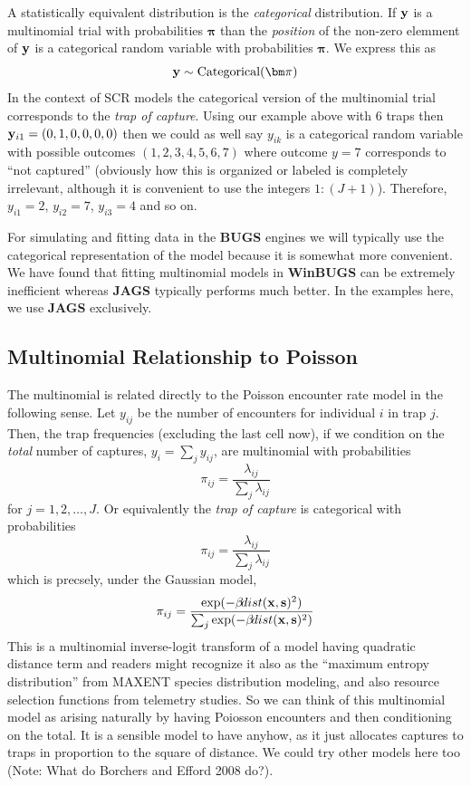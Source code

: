 A statistically equivalent distribution is the {\it categorical} distribution.
If ${\bf y}$ is a multinomial trial with probabilities
${\bm \pi}$ than the {\it position} of the non-zero
elemment of ${\bf y}$ is a categorical random variable with probabilities
${\bm \pi}$.
We express this as
\[
{\bf y} \sim \mbox{Categorical}( {\bm \pi} )
\]
In the context of SCR models the categorical version of the
multinomial trial corresponds to the {\it trap of capture}.  Using our
example above with 6 traps then ${\bf y}_{i1} = (0,1,0,0,0,0)$ then we
could as well say $y_{ik}$ is a categorical random variable with
possible outcomes $(1,2,3,4,5,6,7)$ where outcome $y=7$ corresponds to
``not captured'' (obviously how this is organized or labeled is
completely irrelevant, although it is convenient to use the integers
$1:(J+1)$).  Therefore, $y_{i1} = 2$, $y_{i2} = 7$, $y_{i3} = 4$ and
so on.

For simulating and fitting data in the {\bf BUGS} engines we will typically use
the categorical representation of the model because it is somewhat
more convenient.  We have found that fitting multinomial models in
{\bf WinBUGS} can be extremely inefficient whereas {\bf JAGS}
typically performs much better. In the examples here, we use {\bf
  JAGS} exclusively.

\subsection{Multinomial Relationship to Poisson}

The multinomial is related directly to the Poisson encounter rate
model in the following sense. Let $y_{ij}$ be the number of
encounters for individual $i$ in trap $j$. Then, the trap frequencies
(excluding the last cell now), if we condition on the {\it total}
number of captures, $y_{i} = \sum_{j} y_{ij}$, are multinomial with
probabilities
\[
 \pi_{ij} =  \frac{ \lambda_{ij} } { \sum_{j} \lambda_{ij} } 
\]
for $j=1,2,\ldots,J$.
Or equivalently the {\it trap of
  capture} is categorical with probabilities
\[
 \pi_{ij} =  \frac{ \lambda_{ij} } { \sum_{j} \lambda_{ij} } 
\]
which is precsely, under the Gaussian model, 
\begin{equation} 
\pi_{ij} =  \frac{ \exp( - \beta \! dist({\bf x},{\bf s})^2 ) }  {
   \sum_{j} \exp(-\beta \! dist({\bf x},{\bf s})^2)}
\label{poisson-mn.eq.mnprobs}
\end{equation}
This is a multinomial inverse-logit transform of a model having
quadratic distance term and readers might recognize it
also as the ``maximum entropy distribution'' from MAXENT
species distribution modeling, and also resource selection functions
from telemetry studies.
So we can think of this multinomial model as arising naturally 
by having Poiosson encounters and then conditioning on the total. 
It is a sensible model to have anyhow, as it just allocates captures
to traps in proportion to the square of distance.  We could try other
models here too (Note: What do Borchers and Efford 2008 do?).

